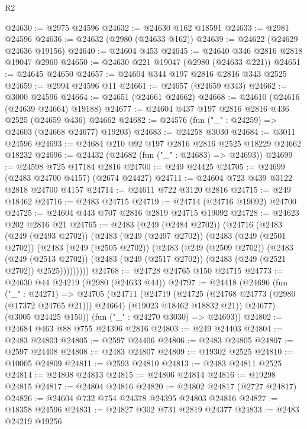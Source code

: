 \begin{lexlean}{R2}
\begin{coremodule}
@24630 := @2975 @24596
@24632 := @24630 @162 @18591
@24633 := @2981 @24596
@24636 := @24632 (@2980 (@24633 @162))
@24639 := @24622 (@24629 @24636 @19156)
@24640 := @24604 @453
@24645 := @24640 @346 @2816 @2818 @19047 @2960
@24650 := @24630 @221 @19047 (@2980 (@24633 @221))
@24651 := @24645 @24650
@24657 := @24604 @344 @197 @2816 @2816 @343 @2525
@24659 := @2994 @24596 @11
@24661 := @24657 (@24659 @343)
@24662 := @3000 @24596
@24664 := @24651 (@24661 @24662)
@24668 := @24610 (@24616 (@24639 @24664) @19188)
@24677 := @24604 @437 @197 @2816 @2816 @436 @2525 (@24659 @436) @24662
@24682 := @24576 (fun ("_" : @24259) => @24603 (@24668 @24677) @19203)
@24683 := @24258 @3030
@24684 := @3011 @24596
@24693 := @24684 @210 @92 @197 @2816 @2816 @2525 @18229 @24662 @18232
@24696 := @24432 (@24682 (fun ("_" : @24683) => @24693))
@24699 := @24598 @725 @17184 @2816
@24700 := @249 @24425
@24705 := @24699 (@2483 @24700 @4157) (@2674 @24427)
@24711 := @24604 @723 @439 @3122 @2818 @24700 @4157
@24714 := @24611 @722 @3120 @2816
@24715 := @249 @18462
@24716 := @2483 @24715
@24719 := @24714 (@24716 @19092) @24700
@24725 := @24604 @443 @707 @2816 @2819 @24715 @19092
@24728 := @24623 @202 @2816 @21
@24765 := @2483
    (@249 (@2484 @2702))
    (@24716
      (@2483
        (@249 (@2493 @2702))
        (@2483
          (@249 (@2497 @2702))
          (@2483
            (@249 (@2501 @2702))
            (@2483
              (@249 (@2505 @2702))
              (@2483
                (@249 (@2509 @2702))
                (@2483
                  (@249 (@2513 @2702))
                  (@2483 (@249 (@2517 @2702)) (@2483 (@249 (@2521 @2702)) @2525)))))))))
@24768 := @24728 @24765 @150 @24715
@24773 := @24630 @44 @24219 (@2980 (@24633 @44))
@24797 := @24418
    (@24696
      (fun ("_" : @24271) =>
      @24705
        (@24711
          (@24719
            (@24725 (@24768 @24773 (@2980 (@17372 @24765 @21))) @24664)
            (@19023 @18462 @18832 @21))
          @24677)
        (@3005 @24425 @150))
      (fun ("_" : @24270 @3030) => @24693))
@24802 := @24684 @463 @88 @755 @24396 @2816
@24803 := @249 @24403
@24804 := @2483 @24803
@24805 := @2597 @24406
@24806 := @2483 @24805
@24807 := @2597 @24408
@24808 := @2483 @24807
@24809 := @19302 @2525
@24810 := @10005 @24809
@24811 := @2593 @24810
@24813 := @2483 @24811 @2525
@24814 := @24808 @24813
@24815 := @24806 @24814
@24816 := @19298 @24815
@24817 := @24804 @24816
@24820 := @24802 @24817 (@2727 @24817)
@24826 := @24604 @732 @754 @24378 @24395 @24803 @24816
@24827 := @18358 @24596
@24831 := @24827 @302 @731 @2819 @24377
@24833 := @2483 @24219 @19256

\end{coremodule}
\end{lexlean}
